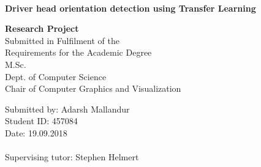 \documentclass[a4paper, 12pt, oneside, BCOR1cm,toc=chapterentrywithdots]{scrbook}
\begin{document}
%
%

\begin{titlepage}

{
    \begin{center}
        \\
    \end{center}
    \vspace{0.5cm}
}

\begin{center}

\LARGE{\textbf{Driver head orientation detection using Transfer Learning}}\\
\vspace{1cm}


\Large{\textbf{Research Project}}\\ 
\vspace{1cm}
Submitted in Fulfilment of the\\
Requirements for the Academic Degree\\
M.Sc.\\
\vspace{0.5cm}
Dept. of Computer Science\\
Chair of Computer Graphics and Visualization
\end{center}
\vspace{2cm}
Submitted by: Adarsh Mallandur\\
Student ID: 457084\\
Date: 19.09.2018\\
\vspace{0.3cm}\\
Supervising tutor: Stephen Helmert \\

\end{titlepage}
\end{document}

